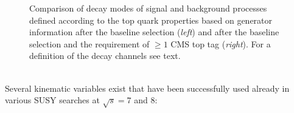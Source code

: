 \begin{figure}[!t]
\centering
{}
\caption{Comparison of decay modes of signal and background processes defined according to the top quark properties based on generator information after the baseline selection (\textit{left}) and after the baseline selection and the requirement of $\ge 1$ CMS top tag (\textit{right}). For a definition of the decay channels see text.}
\label{fig:stop_top_channels}
\end{figure} 
\\
Several kinematic variables exist that have been successfully used already in various SUSY searches at $\sqrt{s} = 7$ and 8\tev:
